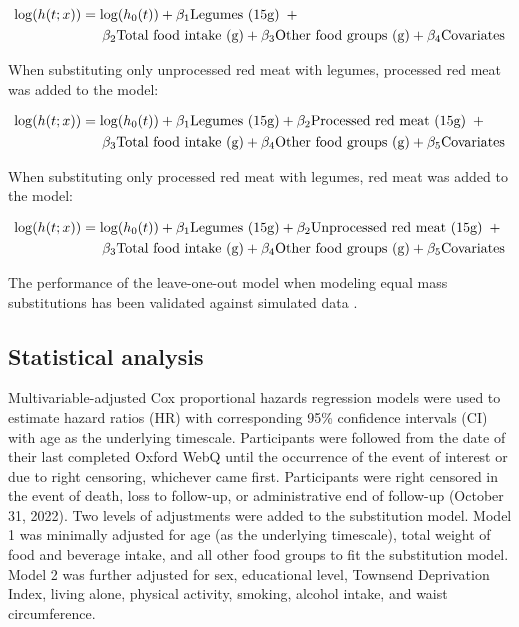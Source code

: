 \documentclass[nutrients,article,submit,moreauthors,pdftex]{Definitions/mdpi}
\begin{document}
\begin{align}
\log(h(t;x)) &= \log(h_0(t)) + \beta_1 \text{Legumes (15g)} \hspace{0.5em} + \nonumber \\
&\quad \hspace{0.5em} \beta_2 \text{Total food intake (g)} + \beta_3 \text{Other food groups (g)} + \beta_4 \text{Covariates}
\end{align}

\noindent When substituting only unprocessed red meat with legumes,
processed red meat was added to the model:

\begin{align}
\log(h(t;x)) &= \log(h_0(t)) + \beta_1 \text{Legumes (15g)} + \beta_2 \text{Processed red meat (15g)} \hspace{0.5em} + \nonumber \\
&\quad \hspace{0.5em} \beta_3 \text{Total food intake (g)} + \beta_4 \text{Other food groups (g)} + \beta_5 \text{Covariates}
\end{align}

\noindent When substituting only processed red meat with legumes, red
meat was added to the model:

\begin{align}
\log(h(t;x)) &= \log(h_0(t)) + \beta_1 \text{Legumes (15g)} + \beta_2 \text{Unprocessed red meat (15g)} \hspace{0.5em} + \nonumber \\
&\quad \hspace{0.5em} \beta_3 \text{Total food intake (g)}  + \beta_4 \text{Other food groups (g)} + \beta_5 \text{Covariates}
\end{align}

\noindent The performance of the leave-one-out model when modeling equal
mass substitutions has been validated against simulated data
\citep{Tomova2022}.

\hypertarget{subsec6}{%
\subsection{Statistical analysis}\label{subsec6}}

Multivariable-adjusted Cox proportional hazards regression models were
used to estimate hazard ratios (HR) with corresponding 95\% confidence
intervals (CI) with age as the underlying timescale. Participants were
followed from the date of their last completed Oxford WebQ until the
occurrence of the event of interest or due to right censoring, whichever
came first. Participants were right censored in the event of death, loss
to follow-up, or administrative end of follow-up (October 31, 2022). Two
levels of adjustments were added to the substitution model. Model 1 was
minimally adjusted for age (as the underlying timescale), total weight
of food and beverage intake, and all other food groups to fit the
substitution model. Model 2 was further adjusted for sex, educational
level, Townsend Deprivation Index, living alone, physical activity,
smoking, alcohol intake, and waist circumference.
\end{document}
